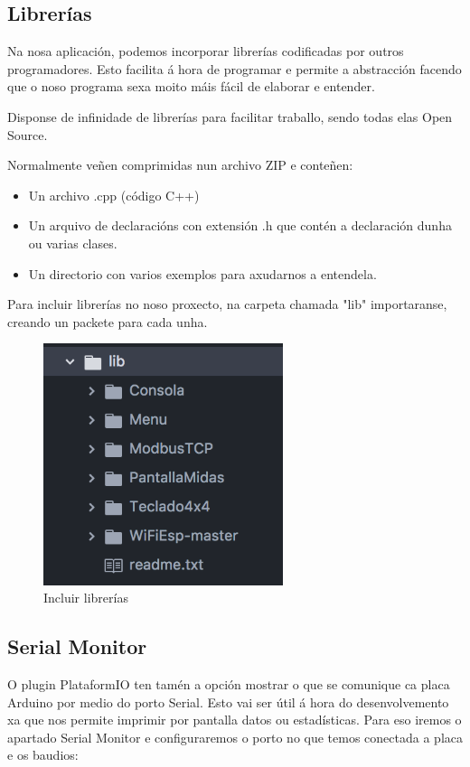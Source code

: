 \documentclass[11pt,twoside]{book}
\begin{document}
\subsection{Librerías}

Na nosa aplicación, podemos incorporar  librerías codificadas por outros programadores. Esto facilita á hora de programar e permite a abstracción facendo que o noso programa sexa moito máis fácil de elaborar e entender.

Disponse de infinidade de librerías para facilitar traballo, sendo todas elas Open Source.

Normalmente veñen comprimidas nun archivo ZIP e conteñen:
\begin{itemize}
\item Un archivo .cpp (código C++)
\item Un arquivo de declaracións con extensión .h que contén a declaración dunha ou varias clases.
\item Un directorio con varios exemplos para axudarnos a entendela.
\end{itemize}

Para incluir librerías no noso proxecto, na carpeta chamada "lib" importaranse, creando un packete para cada unha.

\begin{figure}[H]
	\begin{center}
		\includegraphics[width=7cm]{images/librerias.png}
	\end{center}
	\caption{Incluir librerías}
	\label{fig:LibreriasAtom}
\end{figure}

\subsection{Serial Monitor}

O plugin PlataformIO ten tamén a opción mostrar o que se comunique ca placa Arduino por medio do porto Serial.
Esto vai ser útil á hora do desenvolvemento xa que nos permite imprimir por pantalla datos ou estadísticas.
 Para eso iremos o apartado Serial Monitor e configuraremos o porto no que temos conectada a placa e os baudios:
\end{document}
